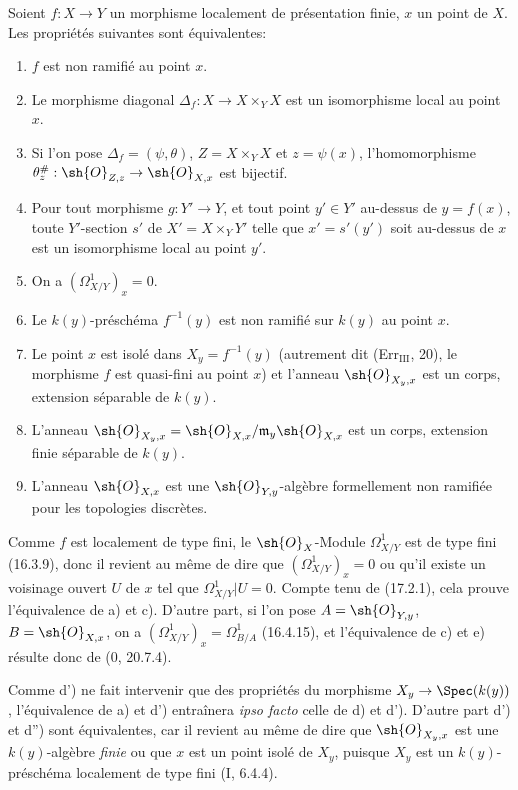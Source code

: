 \begin{theorem}[17.4.1]
\label{IV.17.4.1}
Soient $f:X\to Y$ un morphisme localement de présentation finie, $x$ un point de $X$. Les propriétés suivantes sont équivalentes:
\begin{enumerate}
  \item[a)] $f$ est non ramifié au point $x$.
  \item[b)] Le morphisme diagonal $\Delta_f:X\to X\times_Y X$ est un isomorphisme local au point $x$.
  \item[b')] Si l'on pose $\Delta_f=(\psi,\theta)$, $Z=X\times_Y X$ et $z=\psi(x)$, l'homomorphisme $\theta_z^\#:\sh{O}_{Z,z}\to\sh{O}_{X,x}$ est bijectif.
  \item[b'')] Pour tout morphisme $g:Y'\to Y$, et tout point $y'\in Y'$ au-dessus de $y=f(x)$, toute $Y'$-section $s'$ de $X'=X\times_Y Y'$ telle que $x'=s'(y')$ soit au-dessus de $x$ est un isomorphisme local au point $y'$.
  \item[c)] On a $(\Omega^1_{X/Y})_x=0$.
  \item[d)] Le $k(y)$-préschéma $f^{-1}(y)$ est non ramifié sur $k(y)$ au point $x$.
  \item[d')] Le point $x$ est isolé dans $X_y=f^{-1}(y)$ (autrement dit (Err$_{\mathrm{III}}$, 20), le morphisme $f$ est quasi-fini au point $x$) et l'anneau $\sh{O}_{X_y,x}$ est un corps, extension séparable de $k(y)$.
  \item[d'')] L'anneau $\sh{O}_{X_y,x}=\sh{O}_{X,x}/\mathfrak{m}_y\sh{O}_{X,x}$ est un corps, extension finie séparable de $k(y)$.
  \item[e)] L'anneau $\sh{O}_{X,x}$ est une $\sh{O}_{Y,y}$-algèbre formellement non ramifiée pour les topologies discrètes.
\end{enumerate}
\end{theorem}

Comme $f$ est localement de type fini, le $\sh{O}_X$-Module $\Omega^1_{X/Y}$ est de type fini (16.3.9), donc il revient au même de dire que $(\Omega^1_{X/Y})_x=0$ ou qu'il existe un voisinage ouvert $U$ de $x$ tel que $\Omega^1_{X/Y}|U=0$. Compte tenu de (17.2.1), cela prouve l'équivalence de a) et c). D'autre part, si l'on pose $A=\sh{O}_{Y,y}$, $B=\sh{O}_{X,x}$, on a $(\Omega^1_{X/Y})_x=\Omega^1_{B/A}$ (16.4.15), et l'équivalence de c) et e) résulte donc de (0, 20.7.4).

Comme d') ne fait intervenir que des propriétés du morphisme $X_y\to\Spec(k(y))$, l'équivalence de a) et d') entraînera \emph{ipso facto} celle de d) et d'). D'autre part d') et d'') sont équivalentes, car il revient au même de dire que $\sh{O}_{X_y,x}$ est une $k(y)$-algèbre \emph{finie} ou que $x$ est un point isolé de $X_y$, puisque $X_y$ est un $k(y)$-préschéma localement de type fini (I, 6.4.4).

